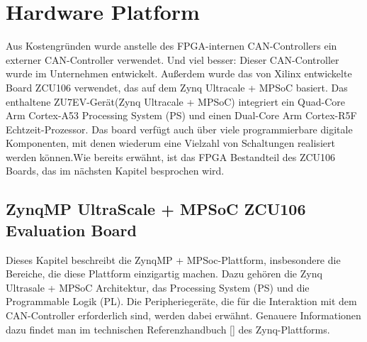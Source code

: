 \section{Hardware Platform}
\label{cha:ver:sec:Hardware_Platform}

Aus Kostengründen wurde anstelle des FPGA-internen CAN-Controllers ein externer CAN-Controller verwendet. Und viel besser: Dieser CAN-Controller wurde im Unternehmen entwickelt.  Außerdem wurde das von Xilinx entwickelte Board ZCU106 verwendet, das auf dem Zynq Ultracale + MPSoC basiert. Das enthaltene ZU7EV-Gerät(Zynq Ultracale + MPSoC) integriert ein Quad-Core Arm Cortex-A53 Processing System (PS) und einen Dual-Core Arm Cortex-R5F Echtzeit-Prozessor. Das board verfügt auch über viele programmierbare digitale Komponenten, mit denen wiederum eine Vielzahl von Schaltungen realisiert werden können.Wie bereits erwähnt, ist das FPGA Bestandteil des ZCU106 Boards, das im nächsten Kapitel besprochen wird.

\subsection{ZynqMP UltraScale + MPSoC ZCU106 Evaluation Board}

Dieses Kapitel beschreibt die ZynqMP + MPSoc-Plattform, insbesondere die Bereiche, die diese Plattform einzigartig machen. Dazu gehören die Zynq Ultrasale + MPSoC Architektur, das Processing System (PS) und die Programmable Logik (PL). Die Peripheriegeräte, die für die Interaktion mit dem CAN-Controller erforderlich sind, werden dabei erwähnt. Genauere Informationen dazu findet man im technischen Referenzhandbuch [\cite{XilinxInc.2019}] des Zynq-Plattforms. 



